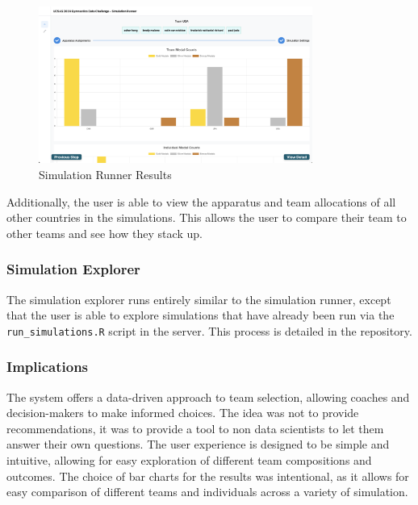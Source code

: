\documentclass{article}
\begin{document}
\begin{figure}[H]
    \centering
    \includegraphics[width=0.8\textwidth]{./results_viewer.png}
    \caption{Simulation Runner Results}
    \label{fig:sim_results}
\end{figure}

\noindent Additionally, the user is able to view the apparatus and team allocations of all 
other countries in the simulations. This allows the user to compare their team
to other teams and see how they stack up.



\subsubsection{Simulation Explorer}

The simulation explorer runs entirely similar to the simulation runner, except that the user
is able to explore simulations that have already been run via the \texttt{run\_simulations.R} script in the server. This 
process is detailed in the repository.

\subsubsection{Implications}
The system offers a data-driven approach to team selection, allowing coaches and decision-makers to make informed choices. 
The idea was not to provide recommendations, it was to provide a tool to non data scientists to let them answer 
their own questions. The user experience is designed to be simple and intuitive, allowing for easy exploration of
different team compositions and outcomes. The choice of bar charts for the results was intentional, as it allows
for easy comparison of different teams and individuals across a variety of simulation.
\end{document}
